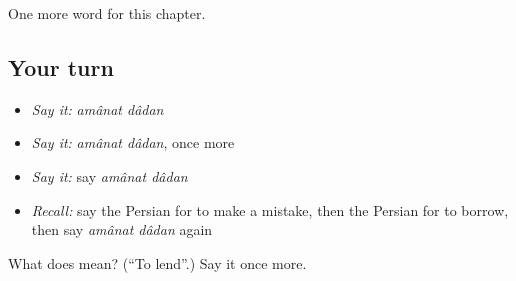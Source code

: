 \begin{grammarlens}[title={What you've built}]
One more word for this chapter.
\end{grammarlens}

\subsection*{Your turn}
\begin{itemize}
\raggedright
  \item \emph{Say it:} \emph{amânat dâdan}
  \item \emph{Say it:} \emph{amânat dâdan}, once more
  \item \emph{Say it:} say \emph{amânat dâdan}
  \item \emph{Recall:} say the Persian for to make a mistake, then the Persian for to borrow, then say \emph{amânat dâdan} again
\end{itemize}

\begin{tcolorbox}[breakable,colback=teal!4,colframe=teal!35!black,title={Before you move on}]
What does   mean? (\textquotedblleft{}To lend\textquotedblright{}.) Say it once more.
\end{tcolorbox}
